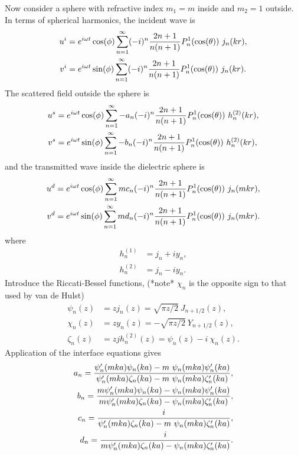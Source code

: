 Now consider a sphere with refractive index $m_1=m$ inside and $m_2=1$ outside.
In terms of spherical harmonics, the incident wave is
\begin{align*}
  u^i &= e^{i\omega t} \cos(\phi) \sum_{n=1}^\infty (-i)^n {2n+1\over n(n+1)} P_n^1(\cos(\theta)) ~j_n(kr), \\
  v^i &= e^{i\omega t} \sin(\phi) \sum_{n=1}^\infty (-i)^n {2n+1\over n(n+1)} P_n^1(\cos(\theta)) ~j_n(kr). \\
\end{align*}
The scattered field outside the sphere is 
\begin{align*}
  u^s &= e^{i\omega t} \cos(\phi) \sum_{n=1}^\infty -a_n (-i)^n {2n+1\over n(n+1)} P_n^1(\cos(\theta)) ~h_n^{(2)}(kr), \\
  v^s &= e^{i\omega t} \sin(\phi) \sum_{n=1}^\infty -b_n (-i)^n {2n+1\over n(n+1)} P_n^1(\cos(\theta)) ~h_n^{(2)}(kr), 
\end{align*}
and the transmitted wave inside the dielectric sphere is 
\begin{align*}
  u^d &= e^{i\omega t} \cos(\phi) \sum_{n=1}^\infty m c_n (-i)^n {2n+1\over n(n+1)} P_n^1(\cos(\theta)) ~j_n(m k r), \\
  v^d &= e^{i\omega t} \sin(\phi) \sum_{n=1}^\infty m d_n (-i)^n {2n+1\over n(n+1)} P_n^1(\cos(\theta)) ~j_n(m k r). 
\end{align*}
where
\begin{align*}
  h_n^{(1)} &= j_n + i y_n,\\
  h_n^{(2)} &= j_n - i y_n . 
\end{align*}
Introduce the Riccati-Bessel functions, (*note* $\chi_n$ is the opposite sign to that used by van de Hulst)
\begin{align*}
  \psi_n(z) &= z j_n(z) = \sqrt{\pi z/2} ~J_{n+1/2}(z),\\ 
  \chi_n(z) &= z y_n(z) = -\sqrt{\pi z/2} ~Y_{n+1/2}(z),\\ 
  \zeta_n(z) &= z j h_n^{(2)}(z) = \psi_n(z) - i~\chi_n(z) . 
\end{align*}
Application of the interface equations gives
\begin{align*}
   a_n = { \psi_n'(mka)\psi_n(ka) - m~\psi_n(mka)\psi_n'(ka) \over
           \psi_n'(mka)\zeta_n(ka) - m~\psi_n(mka)\zeta_n'(ka) } , \\ 
   b_n = {m\psi_n'(mka)\psi_n(ka) -   \psi_n(mka)\psi_n'(ka) \over
          m\psi_n'(mka)\zeta_n(ka) -   \psi_n(mka)\zeta_n'(ka) } , \\
   c_n = { i                                                 \over
           \psi_n'(mka)\zeta_n(ka) - m~\psi_n(mka)\zeta_n'(ka) } , \\ 
   d_n = { i                                                 \over
          m\psi_n'(mka)\zeta_n(ka) -   \psi_n(mka)\zeta_n'(ka) } .
\end{align*}

